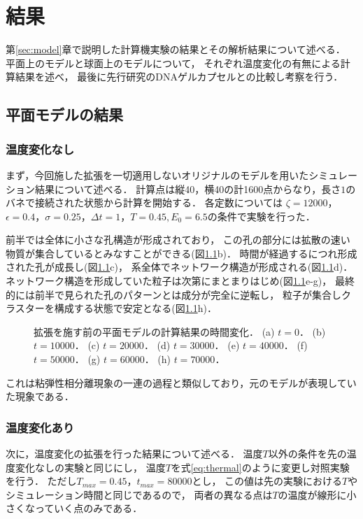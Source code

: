 \chapter{結果}
\label{sec:result}

第\ref{sec:model}章で説明した計算機実験の結果とその解析結果について述べる．
平面上のモデルと球面上のモデルについて，
それぞれ温度変化の有無による計算結果を述べ，
最後に先行研究のDNAゲルカプセルとの比較し考察を行う．


\section{平面モデルの結果}


\subsection{温度変化なし}
まず，今回施した拡張を一切適用しないオリジナルのモデルを用いたシミュレーション結果について述べる．
計算点は縦40，横40の計1600点からなり，長さ$1$のバネで接続された状態から計算を開始する．
各定数については
$\zeta=12000$，$\epsilon=0.4$，$\sigma=0.25$，$\Delta t=1$，$T=0.45, E_0=6.5$の条件で実験を行った．

前半では全体に小さな孔構造が形成されており，
この孔の部分には拡散の速い物質が集合しているとみなすことができる(図\ref{fig:result_2d_without_anearing}b)．
時間が経過するにつれ形成された孔が成長し(図\ref{fig:result_2d_without_anearing}c)，
系全体でネットワーク構造が形成される(図\ref{fig:result_2d_without_anearing}d)．
ネットワーク構造を形成していた粒子は次第にまとまりはじめ(図\ref{fig:result_2d_without_anearing}e-g)，
最終的には前半で見られた孔のパターンとは成分が完全に逆転し，
粒子が集合しクラスターを構成する状態で安定となる(図\ref{fig:result_2d_without_anearing}h)．
\begin{figure}
    \centering
    
    \caption{
        拡張を施す前の平面モデルの計算結果の時間変化．
        (a) $t=0$．
        (b) $t=10000$．
        (c) $t=20000$．
        (d) $t=30000$．
        (e) $t=40000$．
        (f) $t=50000$．
        (g) $t=60000$．
        (h) $t=70000$．
    }
    \label{fig:result_2d_without_anearing}
\end{figure}
これは粘弾性相分離現象の一連の過程と類似しており，元のモデルが表現していた現象である．


\subsection{温度変化あり}
次に，温度変化の拡張を行った結果について述べる．
温度$T$以外の条件を先の温度変化なしの実験と同じにし，
温度$T$を式\ref{eq:thermal}のように変更し対照実験を行う．
ただし$T_{max}=0.45$，$t_{max}=80000$とし，
この値は先の実験における$T$やシミュレーション時間と同じであるので，
両者の異なる点は$T$の温度が線形に小さくなっていく点のみである．

